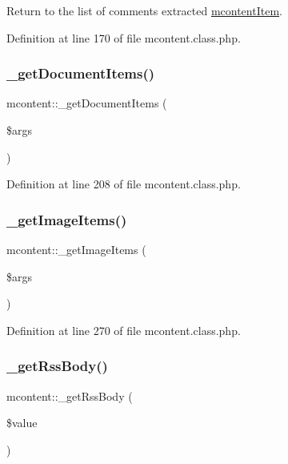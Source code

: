 Return to the list of comments extracted \hyperlink{classmcontentItem}{mcontent\+Item}. 



Definition at line 170 of file mcontent.\+class.\+php.

\hypertarget{classmcontent_a6a6b96bd0a1ce21aab3a350c1584554a}{}\label{classmcontent_a6a6b96bd0a1ce21aab3a350c1584554a} 
\subsubsection{\texorpdfstring{\+\_\+get\+Document\+Items()}{\_getDocumentItems()}}
{\footnotesize\ttfamily mcontent\+::\+\_\+get\+Document\+Items (\begin{DoxyParamCaption}\item[{}]{\$args }\end{DoxyParamCaption})}



Definition at line 208 of file mcontent.\+class.\+php.

\hypertarget{classmcontent_ac6b1900f46d6b9cbc1c1513a90a63811}{}\label{classmcontent_ac6b1900f46d6b9cbc1c1513a90a63811} 
\subsubsection{\texorpdfstring{\+\_\+get\+Image\+Items()}{\_getImageItems()}}
{\footnotesize\ttfamily mcontent\+::\+\_\+get\+Image\+Items (\begin{DoxyParamCaption}\item[{}]{\$args }\end{DoxyParamCaption})}



Definition at line 270 of file mcontent.\+class.\+php.

\hypertarget{classmcontent_a5d41447024e60278f0cf46cea902da52}{}\label{classmcontent_a5d41447024e60278f0cf46cea902da52} 
\subsubsection{\texorpdfstring{\+\_\+get\+Rss\+Body()}{\_getRssBody()}}
{\footnotesize\ttfamily mcontent\+::\+\_\+get\+Rss\+Body (\begin{DoxyParamCaption}\item[{}]{\$value }\end{DoxyParamCaption})}



